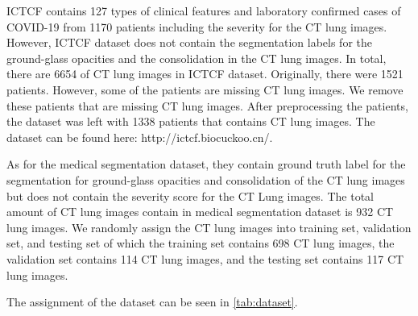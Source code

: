 ICTCF contains 127 types of clinical features and laboratory confirmed cases of COVID-19 from 1170 patients including the severity for the CT lung images. However, ICTCF dataset does not contain the segmentation labels for the ground-glass opacities and the consolidation in the CT lung images. In total, there are 6654 of CT lung images in ICTCF dataset. Originally, there were 1521 patients. However, some of the patients are missing CT lung images. We remove these patients that are missing CT lung images. After preprocessing the patients, the dataset was left with 1338 patients that contains CT lung images. The dataset can be found here: http://ictcf.biocuckoo.cn/. 

As for the medical segmentation dataset, they contain ground truth label for the segmentation for ground-glass opacities and consolidation of the CT lung images but does not contain the severity score for the CT Lung images. The total amount of CT lung images contain in medical segmentation dataset is 932 CT lung images. We randomly assign the CT lung images into training set, validation set, and testing set of which the training set contains 698 CT lung images, the validation set contains 114 CT lung images, and the testing set contains 117 CT lung images. 

The assignment of the dataset can be seen in \ref{tab:dataset}.


